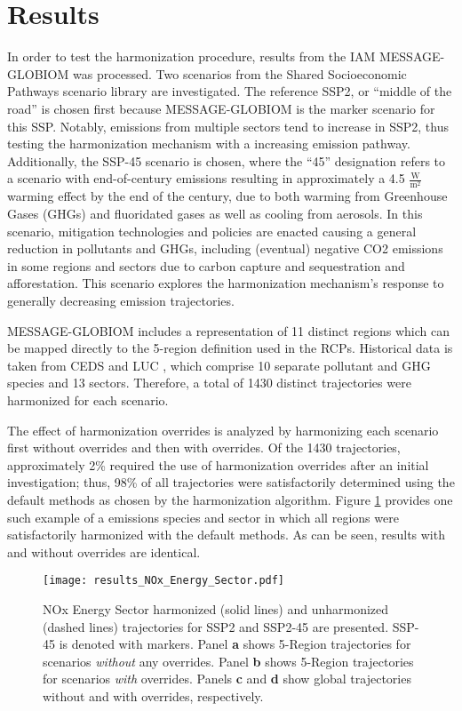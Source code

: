 \section{Results}\label{sec:results}

In order to test the  harmonization procedure, results from the IAM
MESSAGE-GLOBIOM  was processed. Two scenarios from the Shared Socioeconomic
Pathways scenario library  are investigated. The reference SSP2, or
``middle of the road'' is chosen first because MESSAGE-GLOBIOM is the marker
scenario for this SSP. Notably, emissions from multiple sectors tend to increase
in SSP2, thus testing the harmonization mechanism with a increasing emission
pathway. Additionally, the SSP-45 scenario is chosen, where the ``45''
designation refers to a scenario with end-of-century emissions resulting in
approximately a 4.5 $\frac{\text{W}}{\text{m}^2}$ warming effect by the end of
the century, due to both warming from Greenhouse Gases (GHGs) and fluoridated
gases as well as cooling from aerosols. In this scenario, mitigation
technologies and policies are enacted causing a general reduction in pollutants
and GHGs, including (eventual) negative CO2 emissions in some regions and
sectors due to carbon capture and sequestration and afforestation. This scenario
explores the harmonization mechanism's response to generally decreasing emission
trajectories.

MESSAGE-GLOBIOM includes a representation of 11 distinct regions which can be
mapped directly to the 5-region definition used in the RCPs. Historical data is
taken from CEDS and LUC , which comprise 10 separate
pollutant and GHG species and 13 sectors. Therefore, a total of 1430 distinct
trajectories were harmonized for each scenario.

The effect of harmonization overrides is analyzed by harmonizing each scenario
first without overrides and then with overrides. Of the 1430 trajectories,
approximately 2\% required the use of harmonization overrides after an initial
investigation; thus, 98\% of all trajectories were satisfactorily determined
using the default methods as chosen by the harmonization algorithm. Figure
\ref{fig:nox} provides one such example of a emissions species and sector in
which all regions were satisfactorily harmonized with the default methods. As
can be seen, results with and without overrides are identical.

\begin{figure}
  \begin{center}
    \texttt{[image: results\_NOx\_Energy\_Sector.pdf]}
    \caption[]{
      \label{fig:nox}
      NOx Energy Sector harmonized (solid lines) and unharmonized (dashed lines)
      trajectories for SSP2 and SSP2-45 are presented. SSP-45 is denoted with
      markers. Panel \textbf{a} shows 5-Region trajectories for scenarios
      \textit{without} any overrides. Panel \textbf{b} shows 5-Region
      trajectories for scenarios \textit{with} overrides. Panels \textbf{c} and
      \textbf{d} show global trajectories without and with overrides,
      respectively.  }
  \end{center}
\end{figure}

